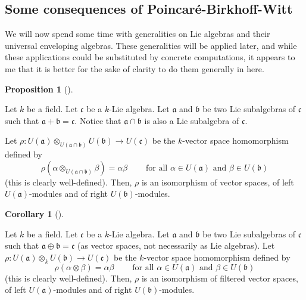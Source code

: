 \documentclass
[numbers=enddot,12pt,final,onecolumn,german,notitlepage]{scrartcl}%
\theoremstyle{definition}
\newtheorem{prop}[theo]{Proposition}
\newenvironment{proposition}[1][]
{\begin{prop}[#1]\begin{leftbar}}
{\end{leftbar}\end{prop}}
\newtheorem{coro}[theo]{Corollary}
\newenvironment{corollary}[1][]
{\begin{coro}[#1]\begin{leftbar}}
{\end{leftbar}\end{coro}}
\begin{document}
\subsection{Some consequences of Poincar\'{e}-Birkhoff-Witt}

We will now spend some time with generalities on Lie algebras and their
universal enveloping algebras. These generalities will be applied later, and
while these applications could be substituted by concrete computations, it
appears to me that it is better for the sake of clarity to do them generally
in here.

\begin{proposition}
\label{prop.U(X)U}Let $k$ be a field. Let $\mathfrak{c}$ be a $k$-Lie algebra.
Let $\mathfrak{a}$ and $\mathfrak{b}$ be two Lie subalgebras of $\mathfrak{c}$
such that $\mathfrak{a}+\mathfrak{b}=\mathfrak{c}$. Notice that $\mathfrak{a}%
\cap\mathfrak{b}$ is also a Lie subalgebra of $\mathfrak{c}$.

Let $\rho:U\left(  \mathfrak{a}\right)  \otimes_{U\left(  \mathfrak{a}%
\cap\mathfrak{b}\right)  }U\left(  \mathfrak{b}\right)  \rightarrow U\left(
\mathfrak{c}\right)  $ be the $k$-vector space homomorphism defined by%
\[
\rho\left(  \alpha\otimes_{U\left(  \mathfrak{a}\cap\mathfrak{b}\right)
}\beta\right)  =\alpha\beta\ \ \ \ \ \ \ \ \ \ \text{for all }\alpha\in
U\left(  \mathfrak{a}\right)  \text{ and }\beta\in U\left(  \mathfrak{b}%
\right)
\]
(this is clearly well-defined). Then, $\rho$ is an isomorphism of vector
spaces, of left $U\left(  \mathfrak{a}\right)  $-modules and of right
$U\left(  \mathfrak{b}\right)  $-modules.
\end{proposition}

\begin{corollary}
\label{cor.U(X)U}Let $k$ be a field. Let $\mathfrak{c}$ be a $k$-Lie algebra.
Let $\mathfrak{a}$ and $\mathfrak{b}$ be two Lie subalgebras of $\mathfrak{c}$
such that $\mathfrak{a}\oplus\mathfrak{b}=\mathfrak{c}$ (as vector spaces, not
necessarily as Lie algebras). Let $\rho:U\left(  \mathfrak{a}\right)
\otimes_{k}U\left(  \mathfrak{b}\right)  \rightarrow U\left(  \mathfrak{c}%
\right)  $ be the $k$-vector space homomorphism defined by%
\[
\rho\left(  \alpha\otimes\beta\right)  =\alpha\beta
\ \ \ \ \ \ \ \ \ \ \text{for all }\alpha\in U\left(  \mathfrak{a}\right)
\text{ and }\beta\in U\left(  \mathfrak{b}\right)
\]
(this is clearly well-defined). Then, $\rho$ is an isomorphism of filtered
vector spaces, of left $U\left(  \mathfrak{a}\right)  $-modules and of right
$U\left(  \mathfrak{b}\right)  $-modules.
\end{corollary}
\end{document}
